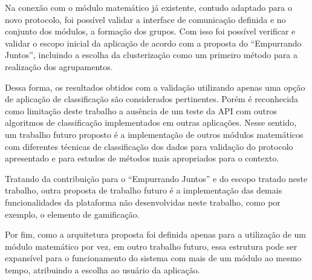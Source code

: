   Na conexão com o módulo matemático já existente, contudo adaptado para o novo protocolo, foi possível validar a interface de 
  comunicação definida e no conjunto dos módulos, a formação dos grupos. Com isso foi possível verificar e validar o escopo 
  inicial da aplicação de acordo com a proposta do ``Empurrando Juntos'', incluindo a escolha da clusterização 
  como um primeiro método para a realização dos agrupamentos. 
  
  Dessa forma, os resultados obtidos com a validação utilizando apenas uma opção de aplicação de classificação são considerados pertinentes.
  Porém é reconhecida como limitação deste trabalho a ausência de um teste da API com outros algoritmos de classificação implementados em outras aplicações.
  Nesse sentido, um trabalho futuro proposto é a implementação de outros módulos matemáticos com diferentes técnicas
  de classificação dos dados para validação do protocolo apresentado e para estudos de métodos mais apropriados para o contexto.
  
  Tratando da contribuição para o ``Empurrando Juntos'' e do escopo tratado neste trabalho, outra proposta de trabalho futuro é a 
  implementação das demais funcionalidades da plataforma não desenvolvidas neste trabalho,
  como por exemplo, o elemento de gamificação.
  
  Por fim, como a arquitetura proposta foi definida apenas para a utilização de um módulo matemático por vez, em outro trabalho futuro, 
  essa estrutura pode ser expansível para o funcionamento do sistema com mais de um módulo ao mesmo tempo, atribuindo a escolha ao usuário da aplicação.
  